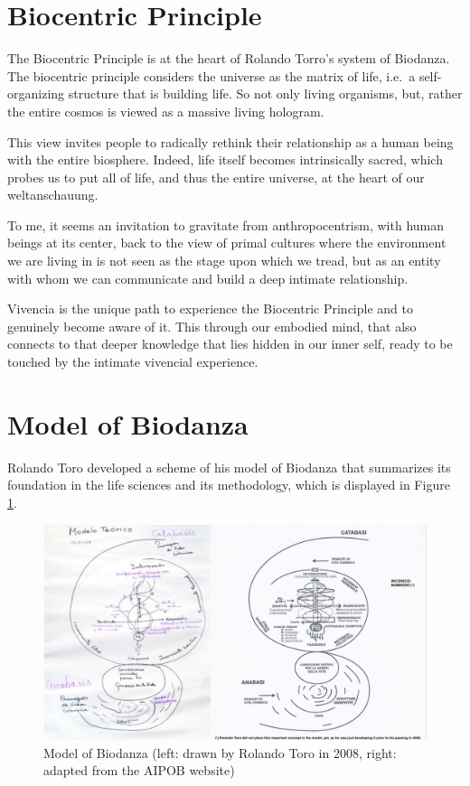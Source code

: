 \documentclass[
  11pt,
]{book}
\begin{document}
\hypertarget{sectionBiocentricPrinciple}{%
\section{Biocentric Principle}\label{sectionBiocentricPrinciple}}

The Biocentric Principle is at the heart of Rolando Torro's system of Biodanza. The biocentric principle considers the universe as the matrix of life, i.e.~a self-organizing structure that is building life. So not only living organisms, but, rather the entire cosmos is viewed as a massive living hologram.

This view invites people to radically rethink their relationship as a human being with the entire biosphere. Indeed, life itself becomes intrinsically sacred, which probes us to put all of life, and thus the entire universe, at the heart of our weltanschauung.

To me, it seems an invitation to gravitate from anthropocentrism, with human beings at its center, back to the view of primal cultures where the environment we are living in is not seen as the stage upon which we tread, but as an entity with whom we can communicate and build a deep intimate relationship.

Vivencia is the unique path to experience the Biocentric Principle and to genuinely become aware of it. This through our embodied mind, that also connects to that deeper knowledge that lies hidden in our inner self, ready to be touched by the intimate vivencial experience.

\hypertarget{sectionModelOfBiodanza}{%
\section{Model of Biodanza}\label{sectionModelOfBiodanza}}

Rolando Toro developed a scheme of his model of Biodanza that summarizes its foundation in the life sciences and its methodology, which is displayed in Figure \ref{fig:model}.

\begin{figure}

{\centering \includegraphics[width=1\linewidth]{./figs/biodanzamodel2andRolando} 

}

\caption{Model of Biodanza (left: drawn by Rolando Toro in 2008, right: adapted from the AIPOB website)}\label{fig:model}
\end{figure}
\end{document}
